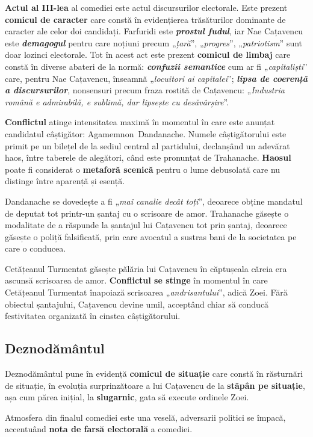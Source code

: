 \documentclass{article}
\newcommand{\qu}[1]{„\emph{#1}”}
\begin{document}
\textbf{Actul al III-lea} al comediei este actul discursurilor electorale. Este prezent \textbf{comicul de caracter} care constă în evidențierea trăsăturilor dominante de caracter ale celor doi candidați. Farfuridi este \textsl{\textbf{prostul fudul}}, iar Nae Cațavencu este \textsl{\textbf{demagogul}} pentru care noțiuni precum \qu{țară}, \qu{progres}, \qu{patriotism} sunt doar lozinci electorale. Tot în acest act este prezent \textbf{comicul de limbaj} care constă în diverse abateri de la normă: \textsl{\textbf{confuzii semantice}} cum ar fi \qu{capitaliști} care, pentru Nae Cațavencu, înseamnă \qu{locuitori ai capitalei}; \textsl{\textbf{lipsa de coerență a discursurilor}}, nonsensuri precum fraza rostită de Cațavencu: \qu{Industria română e admirabilă, e sublimă, dar lipsește cu desăvârșire}.

\textbf{Conflictul} atinge intensitatea maximă în momentul în care este anunțat candidatul câștigător: \mbox{Agamemnon Dandanache}. Numele câștigătorului este primit pe un bilețel de la sediul central al partidului, declanșând un adevărat haos, între taberele de alegători, când este pronunțat de Trahanache. \textbf{Haosul} poate fi considerat o \textbf{metaforă scenică} pentru o lume debusolată care nu distinge între aparență și esență.

Dandanache se dovedește a fi \qu{mai canalie decât toți}, deoarece obține mandatul de deputat tot printr-un șantaj cu o scrisoare de amor. Trahanache găsește o modalitate de a răspunde la șantajul lui Cațavencu tot prin șantaj, deoarece găsește o poliță falsificată, prin care avocatul a sustras bani de la societatea pe care o conducea.

Cetățeanul Turmentat găsește pălăria lui Cațavencu în căptușeala căreia era ascunsă scrisoarea de amor. \textbf{Conflictul se stinge} în momentul în care Cetățeanul Turmentat înapoiază scrisoarea \qu{andrisantului}, adică Zoei. Fără obiectul șantajului, Cațavencu devine umil, acceptând chiar să conducă festivitatea organizată în cinstea câștigătorului.
\subsection{Deznodământul}
Deznodământul pune în evidență \textbf{comicul de situație} care constă în răsturnări de situație, în evoluția surprinzătoare a lui Cațavencu de la \textbf{stăpân pe situație}, așa cum părea inițial, la \textbf{slugarnic}, gata să execute ordinele Zoei.

Atmosfera din finalul comediei este una veselă, adversarii politici se împacă, accentuând \textbf{nota de farsă electorală} a comediei.
\end{document}

